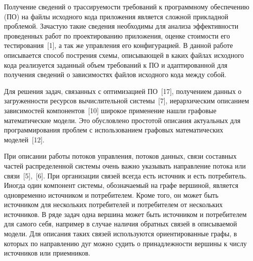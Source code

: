 



Получение сведений о трассируемости требований к программному обеспечению (ПО) на файлы исходного кода приложения является сложной прикладной проблемой. Зачастую такие сведения необходимы для анализа эффективности проведенных работ по проектированию приложения, оценке стоимости его тестирования~[1], а так же управления его конфигурацией. В данной работе описывается способ пострения схемы, описывающей в каких файлах исходного кода реализуется заданный объем требований к ПО и адаптированной для получения сведений о зависимостях файлов исходного кода между собой.

Для решения задач, связанных с оптимизацией ПО~[17], получением данных о загруженности ресурсов вычислительной системы~[7], иерархическим описанием зависимостей компонентов~[10] широкое применение нашли графовые математические модели. Это обусловлено простотой описания актуальных для программирования проблем с использованием графовых математических моделей~[12].

При описании работы потоков управления, потоков данных, связи составных частей распределенной системы очень важно указывать направление потока или связи~[5],~[6]. При организации связей всегда есть источник и есть потребитель. Иногда один компонент системы, обозначаемый на графе вершиной, является одновременно источником и потребителем. Кроме того, он может быть источником для нескольких потребителей и потребителем от нескольких источников. В ряде задач одна вершина может быть источником и потребителем для самого себя, например в случае наличия обратных связей в описываемой модели. Для описания таких связей используются ориентированные графы, в которых по направлению дуг можно судить о принадлежности вершины к числу источников или приемников.

